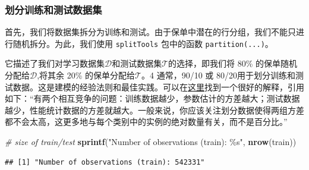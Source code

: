 \documentclass[
]{article}
\newenvironment{Shaded}{\begin{snugshade}}{\end{snugshade}}
\newcommand{\AttributeTok}[1]{\textcolor[rgb]{0.13,0.29,0.53}{#1}}
\newcommand{\CommentTok}[1]{\textcolor[rgb]{0.56,0.35,0.01}{\textit{#1}}}
\newcommand{\FloatTok}[1]{\textcolor[rgb]{0.00,0.00,0.81}{#1}}
\newcommand{\FunctionTok}[1]{\textcolor[rgb]{0.13,0.29,0.53}{\textbf{#1}}}
\newcommand{\NormalTok}[1]{#1}
\newcommand{\OtherTok}[1]{\textcolor[rgb]{0.56,0.35,0.01}{#1}}
\newcommand{\SpecialCharTok}[1]{\textcolor[rgb]{0.81,0.36,0.00}{\textbf{#1}}}
\newcommand{\StringTok}[1]{\textcolor[rgb]{0.31,0.60,0.02}{#1}}
\begin{document}
\subsubsection{划分训练和测试数据集}\label{ux5212ux5206ux8badux7ec3ux548cux6d4bux8bd5ux6570ux636eux96c6}

首先，我们将数据集拆分为训练和测试。由于保单中潜在的行分组，我们不能只进行随机拆分。为此，我们使用
\texttt{splitTools} 包中的函数 \texttt{partition(...)}。

\begin{Shaded}
\end{Shaded}

它描述了我们对学习数据集\(\mathcal{D}\)和测试数据集\(\mathcal{T}\)的选择，即我们将
80\% 的保单随机分配给\(\mathcal{D}\),将其余 20\%
的保单分配给\(\mathcal{T}\)。4 通常，90/10 或
80/20用于划分训练和测试数据。这是建模的经验法则和最佳实践。可以在\href{https://stackoverflow.com/questions/13610074/is-there-a-rule-of-thumb-for-how-to-divide-a-dataset-into-training-and-validatio}{这里}找到一个很好的解释，引用如下：``有两个相互竞争的问题：训练数据越少，参数估计的方差越大；测试数据越少，性能统计数据的方差就越大。一般来说，你应该关注划分数据使得两组方差都不会太高，这更多地与每个类别中的实例的绝对数量有关，而不是百分比。''

\begin{Shaded}
\begin{Highlighting}[]
\CommentTok{\# size of train/test}
\FunctionTok{sprintf}\NormalTok{(}\StringTok{"Number of observations (train): \%s"}\NormalTok{, }\FunctionTok{nrow}\NormalTok{(train))}
\end{Highlighting}
\end{Shaded}

\begin{verbatim}
## [1] "Number of observations (train): 542331"
\end{verbatim}
\end{document}
